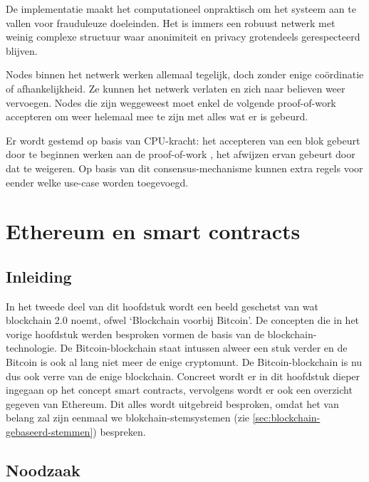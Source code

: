 	De implementatie maakt het computationeel onpraktisch om het systeem aan te vallen voor frauduleuze doeleinden. Het is immers een robuust netwerk met weinig complexe structuur waar anonimiteit en privacy grotendeels gerespecteerd blijven. ~\autocite{Nakamoto2008}
	
	Nodes binnen het netwerk werken allemaal tegelijk, doch zonder enige coördinatie of afhankelijkheid. Ze kunnen het netwerk verlaten en zich naar believen weer vervoegen. Nodes die zijn weggeweest moet enkel de volgende proof-of-work accepteren om weer helemaal mee te zijn met alles wat er is gebeurd. ~\autocite{Nakamoto2008}
	
	Er wordt gestemd op basis van CPU-kracht: het accepteren van een blok gebeurt door te beginnen werken aan de proof-of-work , het afwijzen ervan gebeurt door dat te weigeren. Op basis van dit consensus-mechanisme kunnen extra regels voor eender welke use-case worden toegevoegd. ~\autocite{Nakamoto2008}
	\newpage
\section{Ethereum en smart contracts}
\label{sec:ethereum-en-smart-contracts}
	\subsection*{Inleiding}
		In het tweede deel van dit hoofdstuk wordt een beeld geschetst van wat \textcite{Swan2015} blockchain 2.0 noemt, ofwel `Blockchain voorbij Bitcoin'. De concepten die in het vorige hoofdstuk werden besproken vormen de basis van de blockchain-technologie. De Bitcoin-blockchain staat intussen alweer een stuk verder en de Bitcoin is ook al lang niet meer de enige cryptomunt. De Bitcoin-blockchain is nu dus ook verre van de enige blockchain. Concreet wordt er in dit hoofdstuk dieper ingegaan op het concept  smart contracts, vervolgens wordt er ook een overzicht gegeven van Ethereum. Dit alles wordt uitgebreid besproken, omdat het van belang zal zijn eenmaal we blokchain-stemsystemen (zie \ref{sec:blockchain-gebaseerd-stemmen}) bespreken. \autocite{Buterin2014}
	\subsection{Noodzaak}
